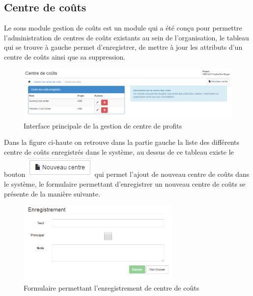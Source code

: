 \documentclass[12pt,a4paper]{report}
\begin{document}
\subsection{Centre de coûts}
Le sous module gestion de coûts est un module qui a été conçu pour permettre l'administration de centres de coûts existants au sein de l'organisation, le tableau qui se trouve à gauche permet d’enregistrer, de mettre à jour les attributs d'un centre de coûts ainsi que sa suppression.
\begin{figure}[h]
\begin{center}
\includegraphics[width=14cm]{pic/CostCenter.png}
\end{center}
\caption{Interface principale de la gestion de centre de profits}
\label{Interface principale de la gestion de centre de profits}
\end{figure}

Dans la figure ci-haute on retrouve dans la partie gauche la liste des différents centre de coûts enregistrés dans le système, au dessus de ce tableau existe le bouton \includegraphics[scale=1]{pic/NewCostCenter.png} qui permet l'ajout de nouveau centre de coûts dans le système, le formulaire permettant d'enregistrer un nouveau centre de coûts se présente de la manière suivante.

\begin{figure}[h]
\begin{center}
\includegraphics[width=8cm]{pic/FormAddCostCenter.png}
\end{center}
\caption{Formulaire permettant l'enregistrement de centre de coûts}
\label{Formulaire permettant l'enregistrement de centre de coûts}
\end{figure} 
\end{document}
